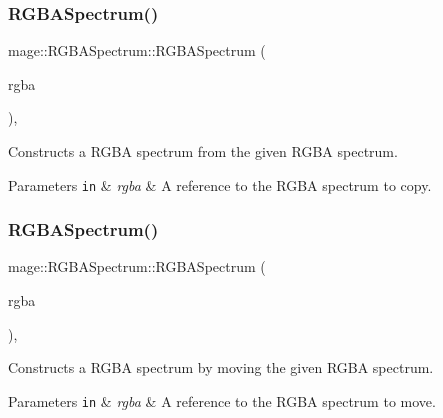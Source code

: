 \subsubsection{\texorpdfstring{R\+G\+B\+A\+Spectrum()}{RGBASpectrum()}\hspace{0.1cm}{\footnotesize\ttfamily [3/10]}}
{\footnotesize\ttfamily mage\+::\+R\+G\+B\+A\+Spectrum\+::\+R\+G\+B\+A\+Spectrum (\begin{DoxyParamCaption}\item[{const \hyperlink{structmage_1_1_r_g_b_a_spectrum}{R\+G\+B\+A\+Spectrum} \&}]{rgba }\end{DoxyParamCaption})\hspace{0.3cm}{\ttfamily [default]}, {\ttfamily [noexcept]}}

Constructs a R\+G\+BA spectrum from the given R\+G\+BA spectrum.


\begin{DoxyParams}[1]{Parameters}
\mbox{\tt in}  & {\em rgba} & A reference to the R\+G\+BA spectrum to copy. \\
\hline
\end{DoxyParams}
\hypertarget{structmage_1_1_r_g_b_a_spectrum_ac53917f6129baafb04d812fcef6e4f56}{}\label{structmage_1_1_r_g_b_a_spectrum_ac53917f6129baafb04d812fcef6e4f56} 
\subsubsection{\texorpdfstring{R\+G\+B\+A\+Spectrum()}{RGBASpectrum()}\hspace{0.1cm}{\footnotesize\ttfamily [4/10]}}
{\footnotesize\ttfamily mage\+::\+R\+G\+B\+A\+Spectrum\+::\+R\+G\+B\+A\+Spectrum (\begin{DoxyParamCaption}\item[{\hyperlink{structmage_1_1_r_g_b_a_spectrum}{R\+G\+B\+A\+Spectrum} \&\&}]{rgba }\end{DoxyParamCaption})\hspace{0.3cm}{\ttfamily [default]}, {\ttfamily [noexcept]}}

Constructs a R\+G\+BA spectrum by moving the given R\+G\+BA spectrum.


\begin{DoxyParams}[1]{Parameters}
\mbox{\tt in}  & {\em rgba} & A reference to the R\+G\+BA spectrum to move. \\
\hline
\end{DoxyParams}
\hypertarget{structmage_1_1_r_g_b_a_spectrum_a4719336b65bee8fc81cffecdc28e2efa}{}\label{structmage_1_1_r_g_b_a_spectrum_a4719336b65bee8fc81cffecdc28e2efa} 
